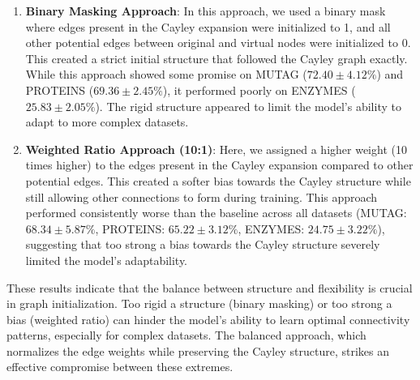 \documentclass[11pt,a4paper]{article}
\begin{document}
\begin{enumerate}
    \item \textbf{Binary Masking Approach}: In this approach, we used a binary mask where edges present in the Cayley expansion were initialized to 1, and all other potential edges between original and virtual nodes were initialized to 0. This created a strict initial structure that followed the Cayley graph exactly. While this approach showed some promise on MUTAG ($72.40 \pm 4.12\%$) and PROTEINS ($69.36 \pm 2.45\%$), it performed poorly on ENZYMES ($25.83 \pm 2.05\%$). The rigid structure appeared to limit the model's ability to adapt to more complex datasets.
    
    \item \textbf{Weighted Ratio Approach (10:1)}: Here, we assigned a higher weight (10 times higher) to the edges present in the Cayley expansion compared to other potential edges. This created a softer bias towards the Cayley structure while still allowing other connections to form during training. This approach performed consistently worse than the baseline across all datasets (MUTAG: $68.34 \pm 5.87\%$, PROTEINS: $65.22 \pm 3.12\%$, ENZYMES: $24.75 \pm 3.22\%$), suggesting that too strong a bias towards the Cayley structure severely limited the model's adaptability.
\end{enumerate}

These results indicate that the balance between structure and flexibility is crucial in graph initialization. Too rigid a structure (binary masking) or too strong a bias (weighted ratio) can hinder the model's ability to learn optimal connectivity patterns, especially for complex datasets. The balanced approach, which normalizes the edge weights while preserving the Cayley structure, strikes an effective compromise between these extremes.
\end{document}
